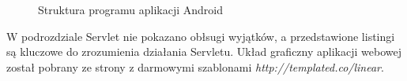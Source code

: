 \documentclass[eng,printmode,oneside]{mgr}
\begin{document}
\begin{figure}[ht!]
\centering
\captionsetup{justification=centering,margin=1cm}
\caption{Struktura programu aplikacji Android}
\end{figure}

W podrozdziale Servlet nie pokazano obłsugi wyjątków, a przedstawione listingi
są kluczowe do zrozumienia działania Servletu. Układ graficzny aplikacji webowej
został pobrany ze strony z darmowymi szablonami
{\textit{http://templated.co/linear}}.
\end{document}
